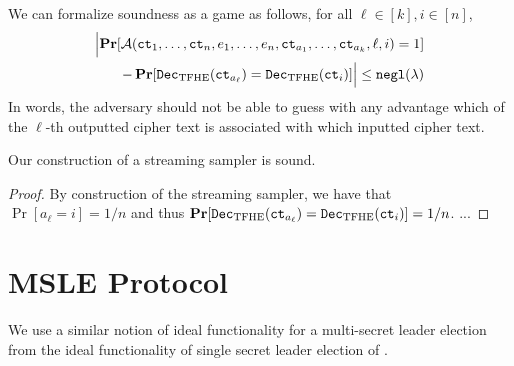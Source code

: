 We can formalize soundness as a game as follows, for all $\ell \in [k], i \in [n]$,
\begin{align}
	\Bigl\lvert 
		\operatorname*{\mathbf{Pr}}[\mathcal{A}(\texttt{ct}_1, \dots, \texttt{ct}_n, e_1, \dots, e_n, \texttt{ct}_{a_1}, \dots, \texttt{ct}_{a_k}, \ell, i) = 1] \\
		- \operatorname*{\mathbf{Pr}}[\texttt{Dec}_{\mathrm{TFHE}}(\texttt{ct}_{a_\ell}) = \texttt{Dec}_{\mathrm{TFHE}}(\texttt{ct}_i)] 
	\Bigr\rvert \leq \texttt{negl}(\lambda) \notag
\end{align}
In words, the adversary should not be able to guess with any advantage which of the $\ell$-th 
outputted cipher text is associated with which inputted cipher text.

\begin{lemma}
	Our construction of a streaming sampler is sound.
	\begin{proof}
		By construction of the streaming sampler, we have that $\Pr[a_\ell = i] = 1/n$ and thus $\operatorname*{\mathbf{Pr}}[\texttt{Dec}_{\mathrm{TFHE}}(\texttt{ct}_{a_\ell}) = \texttt{Dec}_{\mathrm{TFHE}}(\texttt{ct}_i)] = 1/n$.
		...


	\end{proof}
\end{lemma}

\section{MSLE Protocol}
\label{sec:msle_protocol}
We use a similar notion of ideal functionality for a multi-secret leader election from the ideal
functionality of single secret leader election of .

